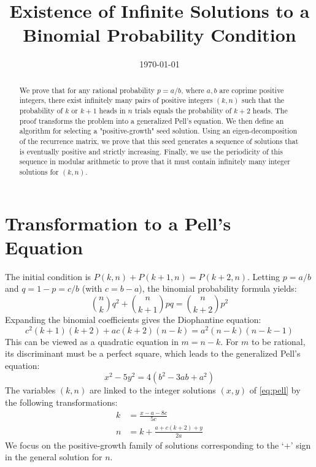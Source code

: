 \documentclass[12pt]{article}
\title{Existence of Infinite Solutions to a Binomial Probability Condition}
\author{}
\date{\today}
\begin{document}
\maketitle

\begin{abstract}
We prove that for any rational probability $p = a/b$, where $a, b$ are coprime positive integers, there exist infinitely many pairs of positive integers $(k,n)$ such that the probability of $k$ or $k+1$ heads in $n$ trials equals the probability of $k+2$ heads. The proof transforms the problem into a generalized Pell's equation. We then define an algorithm for selecting a "positive-growth" seed solution. Using an eigen-decomposition of the recurrence matrix, we prove that this seed generates a sequence of solutions that is eventually positive and strictly increasing. Finally, we use the periodicity of this sequence in modular arithmetic to prove that it must contain infinitely many integer solutions for $(k,n)$.
\end{abstract}

\section{Transformation to a Pell's Equation}
The initial condition is $P(k,n) + P(k+1,n) = P(k+2,n)$. Letting $p=a/b$ and $q=1-p=c/b$ (with $c=b-a$), the binomial probability formula yields:
$$\binom{n}{k} q^2 + \binom{n}{k+1} pq = \binom{n}{k+2} p^2$$
Expanding the binomial coefficients gives the Diophantine equation:
\begin{equation} \label{eq:diophantine}
c^2(k+1)(k+2) + ac(k+2)(n-k) = a^2(n-k)(n-k-1)
\end{equation}
This can be viewed as a quadratic equation in $m = n-k$. For $m$ to be rational, its discriminant must be a perfect square, which leads to the generalized Pell's equation:
\begin{equation} \label{eq:pell}
x^2 - 5y^2 = 4(b^2 - 3ab + a^2)
\end{equation}
The variables $(k,n)$ are linked to the integer solutions $(x,y)$ of \eqref{eq:pell} by the following transformations:
\begin{align}
k &= \frac{x - a - 8c}{5c} \label{eq:k_transform} \\
n &= k + \frac{a + c(k+2) + y}{2a} \label{eq:n_transform_pos}
\end{align}
We focus on the positive-growth family of solutions corresponding to the `$+$' sign in the general solution for $n$.
\end{document}
